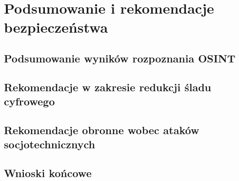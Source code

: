 \chapter{Podsumowanie i rekomendacje bezpieczeństwa}\label{ch:podsumowanie}

\section{Podsumowanie wyników rozpoznania OSINT}\label{sec:podsumowanie-wynikow}

\section{Rekomendacje w zakresie redukcji śladu cyfrowego}\label{sec:rekomendacje-osint}

\section{Rekomendacje obronne wobec ataków socjotechnicznych}\label{sec:rekomendacje-socjo}

\section{Wnioski końcowe}\label{sec:wnioski-koncowe}
